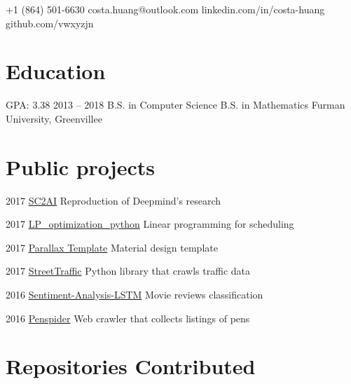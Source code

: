 \documentclass{tccv}
\begin{document}
    {+1 (864) 501-6630}
    {costa.huang@outlook.com}
    {linkedin.com/in/costa-huang}
    {github.com/vwxyzjn}

\section{Education}

\begin{yearlist}

\item[GPA: 3.38]{2013 -- 2018}
     {B.S. in Computer Science \newline B.S. in Mathematics}
     {Furman University, Greenvillee}

\end{yearlist}

\section{Public projects}

\begin{yearlist}

\item{2017}
     {\href{https://costahuang.me/SC2AI/}{SC2AI}}
     {Reproduction of Deepmind's research}

\item{2017}
     {\href{https://costahuang.me/LP_optimization_python/}{LP\_optimization\_python}}
     {Linear programming for scheduling}

\item{2017}
     {\href{https://vuetifyjs.com/themes/parallax-starter/}{Parallax Template}}
     {Material design template}

\item{2017}
     {\href{https://streettraffic.org/}{StreetTraffic}}
     {Python library that crawls traffic data}

\item{2016}
     {\href{https://costahuang.me/Sentiment-Analysis-LSTM/}{Sentiment-Analysis-LSTM}}
     {Movie reviews classification}

\item{2016}
     {\href{https://github.com/vwxyzjn/penspider}{Penspider}}
     {Web crawler that collects listings of pens }

\end{yearlist}

\section{Repositories Contributed}
\end{document}
